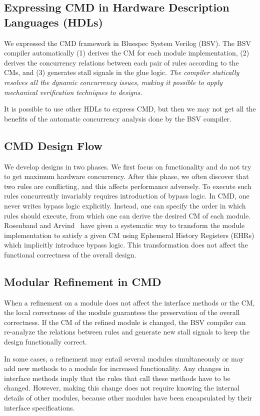 \documentclass[conference]{IEEEtran}
\begin{document}
\subsection{Expressing CMD in Hardware Description Languages (HDLs)}
We expressed the CMD framework in Bluespec System Verilog (BSV).
The BSV compiler automatically (1) derives the CM for each module implementation, (2) derives the concurrency relations between each pair of rules according to the CMs, and (3) generates stall signals in the glue logic.
\emph{The compiler statically resolves all the dynamic concurrency issues, making it possible to apply mechanical verification  techniques to designs.}

It is possible to use other HDLs to express CMD, but then we may not get all the benefits of the automatic concurrency analysis done by the BSV compiler.

\subsection{CMD Design Flow}
We develop designs in two phases.
We first focus on functionality and do not try to get maximum hardware concurrency.
After this phase, we often discover that two rules are conflicting, and this affects performance adversely.
To execute such rules concurrently invariably requires introduction of bypass logic.
In CMD, one never writes bypass logic explicitly.
Instead, one can specify the order in which rules should execute, from which one can derive the desired CM of each module.
Rosenband and Arvind~\cite{rosenband2005hardware} have given a systematic way to transform the module implementation to satisfy a given CM using Ephemeral History Registers (EHRs) which implicitly introduce bypass logic.
This transformation does not affect the functional correctness of the overall design.

\subsection{Modular Refinement in CMD}
When a refinement on a module does not affect the interface methods or the CM, the local correctness of the module guarantees the preservation of the overall correctness.
If the CM of the refined module is changed, the BSV compiler can re-analyze the relations between rules and generate new stall signals to keep the design functionally correct.

In some cases, a refinement may entail several modules simultaneously or may add new methods to a module for increased functionality.
Any changes in interface methods imply that the rules that call these methods have to be changed.
However, making this change does not require knowing the internal details of other modules, because other modules have been encapsulated by their interface specifications.
\end{document}
